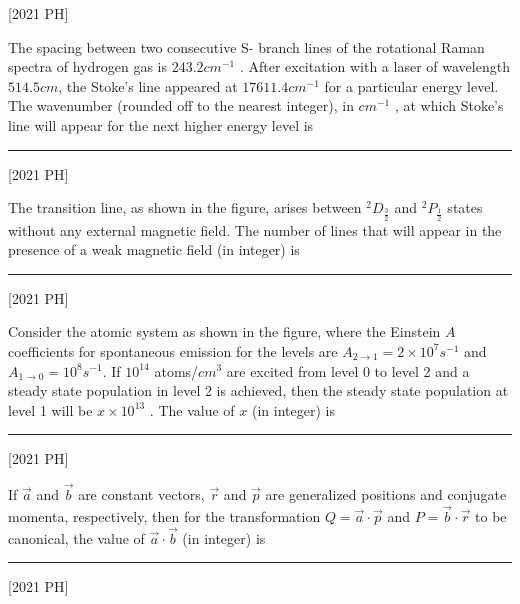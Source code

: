 \hfill [2021 PH]
\item The spacing between two consecutive S- 
branch lines of the rotational Raman
spectra of hydrogen gas is $243. 2 cm^{-1}$
. After excitation with a laser of
wavelength $514.5 cm$, the Stoke's line appeared at $17611.4 cm^{-1}$
for a
particular energy level. The wavenumber (rounded off to the nearest
integer), in $cm^{-1}$
, at which Stoke's line will appear for the next higher energy
level is \rule{2cm}{0.4pt}\hfill [2021 PH]
\item The transition line, as shown in the figure, arises between $^2D_{\frac{3}{2}}$ and $^2P_\frac{1}{2}$ states without any external magnetic field. The number of
lines that will appear in the presence of a weak magnetic field (in integer) is \rule{2cm}{0.4pt} \hfill [2021 PH] 
\begin{figure}[H]
\centering
{}%

\label{fig:my_label}
\end{figure}
\item Consider the atomic system as shown in the figure, where the Einstein $A$
coefficients for spontaneous emission for the levels are $A_{2 \to 1} = 2 \times 10^7 s^{-1}$ and $A_{1 \to 0} = 10^8 s^{-1}$. If $10^{14}$ atoms/$cm^3$ are excited from level 0 to level 2 and a steady state population in level 2 is achieved, then the steady state
population at level 1 will be $x \times 10^{13} $
. The value of $x$ (in integer) is \rule{2cm}{0.4pt}\hfill [2021 PH] 
\begin{figure}[H]
\centering
{}%

\label{fig:my_label}
\end{figure}
\item If $\vec{a}$ and $\vec{b}$ are constant vectors, $\vec{r}$ and $\vec{p}$ are generalized positions and
conjugate momenta, respectively, then for the transformation $Q = \vec{a}\cdot \vec{p}$ and
$P = \vec{b} \cdot \vec{r}$ to be canonical, the value of $\vec{a} \cdot \vec{b}$ (in integer) is \rule{2cm}{0.4pt}\hfill [2021 PH]

